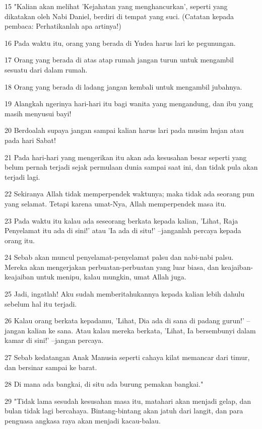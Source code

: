 \par 15 "Kalian akan melihat 'Kejahatan yang menghancurkan', seperti yang dikatakan oleh Nabi Daniel, berdiri di tempat yang suci. (Catatan kepada pembaca: Perhatikanlah apa artinya!)
\par 16 Pada waktu itu, orang yang berada di Yudea harus lari ke pegunungan.
\par 17 Orang yang berada di atas atap rumah jangan turun untuk mengambil sesuatu dari dalam rumah.
\par 18 Orang yang berada di ladang jangan kembali untuk mengambil jubahnya.
\par 19 Alangkah ngerinya hari-hari itu bagi wanita yang mengandung, dan ibu yang masih menyusui bayi!
\par 20 Berdoalah supaya jangan sampai kalian harus lari pada musim hujan atau pada hari Sabat!
\par 21 Pada hari-hari yang mengerikan itu akan ada kesusahan besar seperti yang belum pernah terjadi sejak permulaan dunia sampai saat ini, dan tidak pula akan terjadi lagi.
\par 22 Sekiranya Allah tidak memperpendek waktunya; maka tidak ada seorang pun yang selamat. Tetapi karena umat-Nya, Allah memperpendek masa itu.
\par 23 Pada waktu itu kalau ada seseorang berkata kepada kalian, 'Lihat, Raja Penyelamat itu ada di sini!' atau 'Ia ada di situ!' --janganlah percaya kepada orang itu.
\par 24 Sebab akan muncul penyelamat-penyelamat palsu dan nabi-nabi palsu. Mereka akan mengerjakan perbuatan-perbuatan yang luar biasa, dan keajaiban-keajaiban untuk menipu, kalau mungkin, umat Allah juga.
\par 25 Jadi, ingatlah! Aku sudah memberitahukannya kepada kalian lebih dahulu sebelum hal itu terjadi.
\par 26 Kalau orang berkata kepadamu, 'Lihat, Dia ada di sana di padang gurun!' --jangan kalian ke sana. Atau kalau mereka berkata, 'Lihat, Ia bersembunyi dalam kamar di sini!' --jangan percaya.
\par 27 Sebab kedatangan Anak Manusia seperti cahaya kilat memancar dari timur, dan bersinar sampai ke barat.
\par 28 Di mana ada bangkai, di situ ada burung pemakan bangkai."
\par 29 "Tidak lama sesudah kesusahan masa itu, matahari akan menjadi gelap, dan bulan tidak lagi bercahaya. Bintang-bintang akan jatuh dari langit, dan para penguasa angkasa raya akan menjadi kacau-balau.
